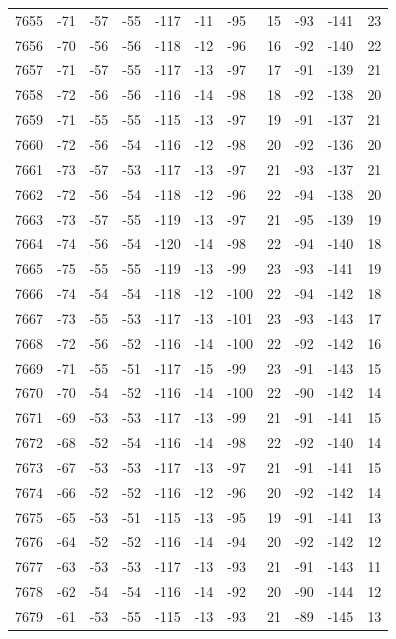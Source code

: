 \begin{table}[H]
\begin{tabular}{lllllllllll}
7655 & -71 & -57 & -55 & -117 & -11 & -95 & 15 & -93 & -141 & 23 \\
7656 & -70 & -56 & -56 & -118 & -12 & -96 & 16 & -92 & -140 & 22 \\
7657 & -71 & -57 & -55 & -117 & -13 & -97 & 17 & -91 & -139 & 21 \\
7658 & -72 & -56 & -56 & -116 & -14 & -98 & 18 & -92 & -138 & 20 \\
7659 & -71 & -55 & -55 & -115 & -13 & -97 & 19 & -91 & -137 & 21 \\
7660 & -72 & -56 & -54 & -116 & -12 & -98 & 20 & -92 & -136 & 20 \\
7661 & -73 & -57 & -53 & -117 & -13 & -97 & 21 & -93 & -137 & 21 \\
7662 & -72 & -56 & -54 & -118 & -12 & -96 & 22 & -94 & -138 & 20 \\
7663 & -73 & -57 & -55 & -119 & -13 & -97 & 21 & -95 & -139 & 19 \\
7664 & -74 & -56 & -54 & -120 & -14 & -98 & 22 & -94 & -140 & 18 \\
7665 & -75 & -55 & -55 & -119 & -13 & -99 & 23 & -93 & -141 & 19 \\
7666 & -74 & -54 & -54 & -118 & -12 & -100 & 22 & -94 & -142 & 18 \\
7667 & -73 & -55 & -53 & -117 & -13 & -101 & 23 & -93 & -143 & 17 \\
7668 & -72 & -56 & -52 & -116 & -14 & -100 & 22 & -92 & -142 & 16 \\
7669 & -71 & -55 & -51 & -117 & -15 & -99 & 23 & -91 & -143 & 15 \\
7670 & -70 & -54 & -52 & -116 & -14 & -100 & 22 & -90 & -142 & 14 \\
7671 & -69 & -53 & -53 & -117 & -13 & -99 & 21 & -91 & -141 & 15 \\
7672 & -68 & -52 & -54 & -116 & -14 & -98 & 22 & -92 & -140 & 14 \\
7673 & -67 & -53 & -53 & -117 & -13 & -97 & 21 & -91 & -141 & 15 \\
7674 & -66 & -52 & -52 & -116 & -12 & -96 & 20 & -92 & -142 & 14 \\
7675 & -65 & -53 & -51 & -115 & -13 & -95 & 19 & -91 & -141 & 13 \\
7676 & -64 & -52 & -52 & -116 & -14 & -94 & 20 & -92 & -142 & 12 \\
7677 & -63 & -53 & -53 & -117 & -13 & -93 & 21 & -91 & -143 & 11 \\
7678 & -62 & -54 & -54 & -116 & -14 & -92 & 20 & -90 & -144 & 12 \\
7679 & -61 & -53 & -55 & -115 & -13 & -93 & 21 & -89 & -145 & 13 \\

\end{tabular}
\end{table}
